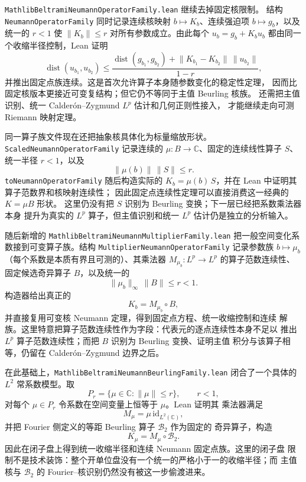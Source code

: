 \documentclass[UTF8,fontset=none,a4paper,11pt]{ctexart}
\begin{document}
\texttt{MathlibBeltramiNeumannOperator}\allowbreak\texttt{Family.lean}\linebreak
继续去掉固定核限制。
结构 \texttt{NeumannOperatorFamily} 同时记录连续核映射
\(b\mapsto K_b\)、连续强迫项 \(b\mapsto g_b\)，以及统一的
\(r<1\) 使 \(\lVert K_b\rVert\leq r\) 对所有参数成立。由此每个
\(u_b=g_b+K_bu_b\) 都由同一个收缩半径控制，Lean 证明
\[
 \operatorname{dist}(u_{b_1},u_{b_2})
 \leq
 \frac{\operatorname{dist}(g_{b_1},g_{b_2})
       +\lVert K_{b_1}-K_{b_2}\rVert\,\lVert u_{b_2}\rVert}
      {1-r},
\]
并推出固定点族连续。这是首次允许算子本身随参数变化的稳定性定理，
因而比固定核版本更接近可变复结构；但它仍不等同于主值 Beurling 核族。
还需把主值识别、统一 Calderón--Zygmund \(L^p\) 估计和几何正则性接入，
才能继续走向可测 Riemann 映射定理。\par

同一算子族文件现在还把抽象核具体化为标量缩放形状。
\texttt{ScaledNeumannOperatorFamily} 记录连续的
\(\mu:B\to\mathbb C\)、固定的连续线性算子 \(S\)、统一半径 \(r<1\)，以及
\[
 \lVert\mu(b)\rVert\,\lVert S\rVert\leq r.
\]
\texttt{toNeumannOperatorFamily} 随后构造实际的
\(K_b=\mu(b)\,S\)，并在 Lean 中证明其算子范数界和核映射连续性；
因此固定点连续性定理可以直接消费这一经典的 \(K=\mu B\) 形状。
这里仍没有把 \(S\) 识别为 Beurling 变换；下一层已经把系数乘法器本身
提升为真实的 \(L^p\) 算子，但主值识别和统一 \(L^p\) 估计仍是独立的分析输入。\par

随后新增的
\texttt{MathlibBeltramiNeumann}\allowbreak\texttt{MultiplierFamily.lean}
把一般空间变化系数接到可变算子族。结构
\texttt{MultiplierNeumannOperatorFamily} 记录参数族
\(b\mapsto\mu_b\)（每个系数是本质有界且可测的）、其乘法器
\(M_{\mu_b}:L^p\to L^p\) 的算子范数连续性、固定候选奇异算子
\(B\)，以及统一的
\[
 \lVert\mu_b\rVert_{\infty}\,\lVert B\rVert\leq r<1.
\]
构造器给出真正的
\[
 K_b=M_{\mu_b}\circ B,
\]
并直接复用可变核 Neumann 定理，得到固定点方程、统一收缩控制和连续
解族。这里特意把算子范数连续性作为字段：代表元的逐点连续性本身不足以
推出 \(L^p\) 算子范数连续性；而把 \(B\) 识别为 Beurling 变换、证明主值
积分与该算子相等，仍留在 Calderón--Zygmund 边界之后。\par

在此基础上，\texttt{MathlibBeltramiNeumann}\allowbreak\texttt{BeurlingFamily.lean}
闭合了一个具体的 \(L^2\) 常系数模型。取
\[
 P_r=\{\mu\in\mathbb C:\lVert\mu\rVert\le r\},\qquad r<1,
\]
对每个 \(\mu\in P_r\) 令系数在空间变量上恒等于 \(\mu\)。Lean 证明其
乘法器满足
\[
 M_\mu=\mu\,\mathrm{id}_{L^2(\mathbb C)},
\]
并把 Fourier 侧定义的等距 Beurling 算子 \(\mathcal B_2\) 作为固定的
奇异算子，构造
\[
 K_\mu=M_\mu\circ\mathcal B_2.
\]
因此在闭子盘上得到统一收缩半径和连续 Neumann 固定点族。这里的闭子盘
限制不是技术装饰：整个开单位盘没有一个统一的严格小于一的收缩半径；而
主值核与 \(\mathcal B_2\) 的 Fourier--核识别仍然没有被这一步偷渡进来。\par
\end{document}
